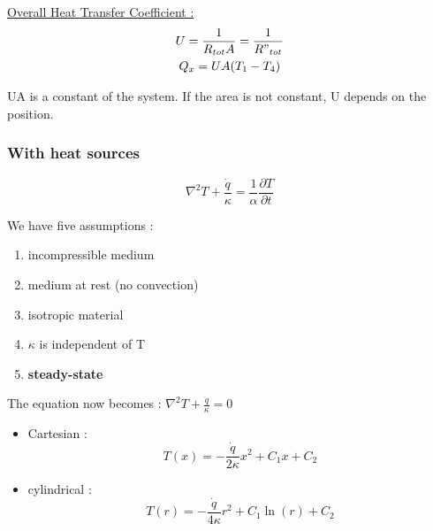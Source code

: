 \documentclass[../main.tex]{subfiles}
\begin{document}
\quad \underline{Overall Heat Transfer Coefficient :}\\

\begin{equation}
    \begin{gathered}
        U = \frac{1}{R_{tot}A} = \frac{1}{R"_{tot}}\\
        Q_x = UA(T_1-T_4)\\
    \end{gathered}
\end{equation}

\warning UA is a constant of the system. If the area is not constant, U depends on the position.\\

\subsubsection{With heat sources}
\begin{equation}
    \nabla^2T + \frac{\dot{q}}{\kappa} = \frac{1}{\alpha} \frac{\partial T}{\partial t}
\end{equation}

We have five assumptions : \begin{enumerate}
    \item incompressible medium\\
    \item medium at rest (no convection)\\
    \item isotropic material\\
    \item $\kappa$ is independent of T\\
    \item \textbf{steady-state}\\
\end{enumerate}

The equation now becomes : $\nabla^2T + \frac{\dot{q}}{\kappa} = 0$\\

\begin{itemize}
    \item Cartesian : \begin{equation}
        T(x) = -\frac{\dot{q}}{2\kappa}x^2 + C_1 x + C_2
    \end{equation}
    \item cylindrical : \begin{equation}
        T(r) = -\frac{\dot{q}}{4\kappa}r^2 + C_1\ln(r) + C_2
    \end{equation}
\end{itemize}
\end{document}
